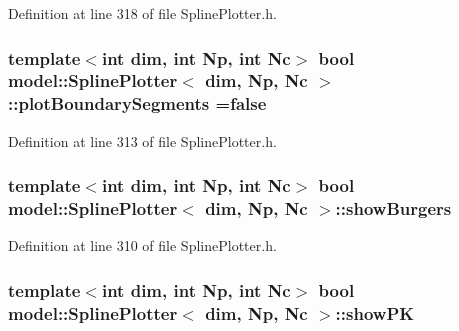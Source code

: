 Definition at line 318 of file Spline\+Plotter.\+h.

\hypertarget{classmodel_1_1_spline_plotter_a8ed220be6d2afa539f9fe39e172213e0}{}
\subsubsection[{plot\+Boundary\+Segments}]{\setlength{\rightskip}{0pt plus 5cm}template$<$int dim, int Np, int Nc$>$ bool {\bf model\+::\+Spline\+Plotter}$<$ {\bf dim}, Np, {\bf Nc} $>$\+::plot\+Boundary\+Segments =false\hspace{0.3cm}{\ttfamily [static]}}\label{classmodel_1_1_spline_plotter_a8ed220be6d2afa539f9fe39e172213e0}


Definition at line 313 of file Spline\+Plotter.\+h.

\hypertarget{classmodel_1_1_spline_plotter_a0140de0e383162a573a03617855270dc}{}
\subsubsection[{show\+Burgers}]{\setlength{\rightskip}{0pt plus 5cm}template$<$int dim, int Np, int Nc$>$ bool {\bf model\+::\+Spline\+Plotter}$<$ {\bf dim}, Np, {\bf Nc} $>$\+::show\+Burgers}\label{classmodel_1_1_spline_plotter_a0140de0e383162a573a03617855270dc}


Definition at line 310 of file Spline\+Plotter.\+h.

\hypertarget{classmodel_1_1_spline_plotter_af18e54b835b0983b17f8c599156d3d34}{}
\subsubsection[{show\+P\+K}]{\setlength{\rightskip}{0pt plus 5cm}template$<$int dim, int Np, int Nc$>$ bool {\bf model\+::\+Spline\+Plotter}$<$ {\bf dim}, Np, {\bf Nc} $>$\+::show\+P\+K}\label{classmodel_1_1_spline_plotter_af18e54b835b0983b17f8c599156d3d34}


